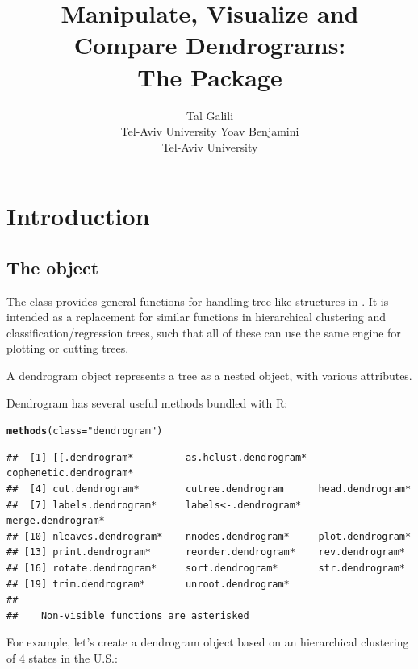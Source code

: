 \documentclass[shortnames,nojss,article]{jss}\usepackage{graphicx, color}
\author{Tal Galili\\Tel-Aviv University \And Yoav Benjamini\\Tel-Aviv University}
\title{Manipulate, Visualize and Compare Dendrograms:\\ The \pkg{dendextend} \proglang{R} Package}
\makeatletter
\newcommand{\hlfunctioncall}[1]{\textcolor[rgb]{0.501960784313725,0,0.329411764705882}{\textbf{#1}}}%
\newcommand{\hlstring}[1]{\textcolor[rgb]{0.6,0.6,1}{#1}}%
\newenvironment{kframe}{%
 \def\at@end@of@kframe{}%
 \ifinner\ifhmode%
  \def\at@end@of@kframe{\end{minipage}}%
  \begin{minipage}{\columnwidth}%
 \fi\fi%
 \def\FrameCommand##1{\hskip\@totalleftmargin \hskip-\fboxsep
 \colorbox{shadecolor}{##1}\hskip-\fboxsep
     \hskip-\linewidth \hskip-\@totalleftmargin \hskip\columnwidth}%
 \MakeFramed {\advance\hsize-\width
   \@totalleftmargin\z@ \linewidth\hsize
   \@setminipage}}%
 {\par\unskip\endMakeFramed%
 \at@end@of@kframe}
\newenvironment{knitrout}{}{} %
\makeatother
\begin{document}
\vspace*{-0.25cm}



\section{Introduction}

\subsection{The  object}

The  class provides general functions for handling tree-like structures in  \citep{R:Main}. It is intended as a replacement for similar functions in hierarchical clustering and classification/regression trees, such that all of these can use the same engine for plotting or cutting trees.

A dendrogram object represents a tree as a nested  object, with various attributes.

Dendrogram has several useful methods bundled with R:

\begin{knitrout}
\color{fgcolor}\begin{kframe}
\begin{alltt}
\hlfunctioncall{methods}(class = \hlstring{"dendrogram"})
\end{alltt}
\begin{verbatim}
##  [1] [[.dendrogram*         as.hclust.dendrogram*  cophenetic.dendrogram*
##  [4] cut.dendrogram*        cutree.dendrogram      head.dendrogram*      
##  [7] labels.dendrogram*     labels<-.dendrogram*   merge.dendrogram*     
## [10] nleaves.dendrogram*    nnodes.dendrogram*     plot.dendrogram*      
## [13] print.dendrogram*      reorder.dendrogram*    rev.dendrogram*       
## [16] rotate.dendrogram*     sort.dendrogram*       str.dendrogram*       
## [19] trim.dendrogram*       unroot.dendrogram*    
## 
##    Non-visible functions are asterisked
\end{verbatim}
\end{kframe}
\end{knitrout}


For example, let's create a dendrogram object based on an hierarchical clustering of 4 states in the U.S.:
\end{document}
